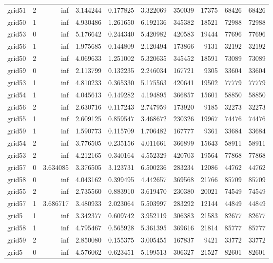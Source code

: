 \begin{longtable}{|l|r|r|r|r|r|r|r|r|r|}
grid51 & 2 & inf & 3.144244 & 0.177825 & 3.322069 & 350039 & 17375 & 68426 & 68426 \\
grid50 & 1 & inf & 4.930486 & 1.261650 & 6.192136 & 345382 & 18521 & 72988 & 72988 \\
grid53 & 0 & inf & 5.176642 & 0.244340 & 5.420982 & 420583 & 19444 & 77696 & 77696 \\
grid56 & 1 & inf & 1.975685 & 0.144809 & 2.120494 & 173866 & 9131 & 32192 & 32192 \\
grid50 & 2 & inf & 4.069633 & 1.251002 & 5.320635 & 345452 & 18591 & 73089 & 73089 \\
grid59 & 0 & inf & 2.113799 & 0.132235 & 2.246034 & 167721 & 9305 & 33604 & 33604 \\
grid53 & 1 & inf & 4.810233 & 0.365330 & 5.175563 & 420641 & 19502 & 77779 & 77779 \\
grid54 & 1 & inf & 4.045613 & 0.149282 & 4.194895 & 366857 & 15601 & 58850 & 58850 \\
grid56 & 2 & inf & 2.630716 & 0.117243 & 2.747959 & 173920 & 9185 & 32273 & 32273 \\
grid55 & 1 & inf & 2.609125 & 0.859547 & 3.468672 & 230326 & 19967 & 74476 & 74476 \\
grid59 & 1 & inf & 1.590773 & 0.115709 & 1.706482 & 167777 & 9361 & 33684 & 33684 \\
grid54 & 2 & inf & 3.776505 & 0.235156 & 4.011661 & 366899 & 15643 & 58911 & 58911 \\
grid53 & 2 & inf & 4.212165 & 0.340164 & 4.552329 & 420703 & 19564 & 77868 & 77868 \\
grid57 & 0 & 3.634085 & 3.376505 & 3.123731 & 6.500236 & 283234 & 12086 & 44762 & 44762 \\
grid58 & 0 & inf & 4.043162 & 0.399495 & 4.442657 & 369568 & 21766 & 85709 & 85709 \\
grid55 & 2 & inf & 2.735560 & 0.883910 & 3.619470 & 230380 & 20021 & 74549 & 74549 \\
grid57 & 1 & 3.686717 & 3.480933 & 2.023064 & 5.503997 & 283292 & 12144 & 44849 & 44849 \\
grid5 & 1 & inf & 3.342377 & 0.609742 & 3.952119 & 306383 & 21583 & 82677 & 82677 \\
grid58 & 1 & inf & 4.795467 & 0.565928 & 5.361395 & 369616 & 21814 & 85777 & 85777 \\
grid59 & 2 & inf & 2.850080 & 0.155375 & 3.005455 & 167837 & 9421 & 33772 & 33772 \\
grid5 & 0 & inf & 4.576062 & 0.623451 & 5.199513 & 306327 & 21527 & 82601 & 82601 \\

\end{longtable}
